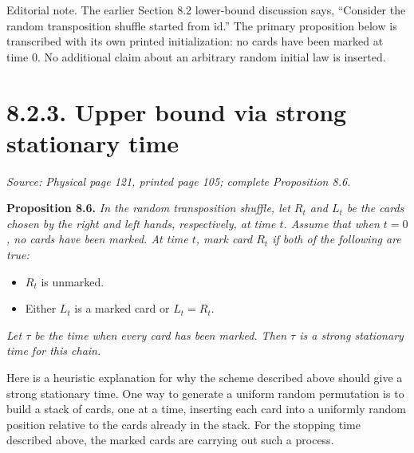 \documentclass[11pt]{article}
\newcommand{\sourceloc}[1]{\par\smallskip\noindent\textit{Source: #1.}\par\nopagebreak[4]\smallskip}
\newcommand{\editorial}[1]{\par\smallskip\noindent\textsf{Editorial note.} #1\par\smallskip}
\begin{document}
\editorial{The earlier Section 8.2 lower-bound discussion says,
``Consider the random transposition shuffle started from $\mathrm{id}$.''
The primary proposition below is transcribed with its own printed
initialization: no cards have been marked at time $0$. No additional
claim about an arbitrary random initial law is inserted.}

\section*{8.2.3. Upper bound via strong stationary time}
\sourceloc{Physical page 121, printed page 105; complete Proposition 8.6}
\noindent\textbf{Proposition 8.6.}
\emph{In the random transposition shuffle, let $R_t$ and $L_t$ be the
cards chosen by the right and left hands, respectively, at time $t$.
Assume that when $t=0$, no cards have been marked. At time $t$, mark card
$R_t$ if both of the following are true:}
\begin{itemize}
\item $R_t$ is unmarked.
\item Either $L_t$ is a marked card or $L_t=R_t$.
\end{itemize}
\emph{Let $\tau$ be the time when every card has been marked. Then $\tau$
is a strong stationary time for this chain.}

Here is a heuristic explanation for why the scheme described above
should give a strong stationary time. One way to generate a uniform
random permutation is to build a stack of cards, one at a time,
inserting each card into a uniformly random position relative to the
cards already in the stack. For the stopping time described above, the
marked cards are carrying out such a process.
\end{document}
